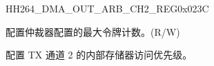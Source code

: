 \begin{register}{H}{H264\_DMA\_OUT\_ARB\_CH2\_REG}{0x023C}\label{regdesc:H264DMAOUTARBCH2REG}
%
%
%
%
\regnewline%
\begin{regdesc}\begin{reglist}
\label{fielddesc:H264DMAOUTARBTOKENNUMCH2}\item [H264\_DMA\_OUT\_ARB\_TOKEN\_NUM\_CH2] 配置仲裁器配置的最大令牌计数。(R/W)
\label{fielddesc:H264DMAINTEROUTARBPRIORITYCH2}\item [H264\_DMA\_INTER\_OUT\_ARB\_PRIORITY\_CH2] 配置 TX 通道 2 的内部存储器访问优先级。
\end{reglist}\end{regdesc}
\end{register}



